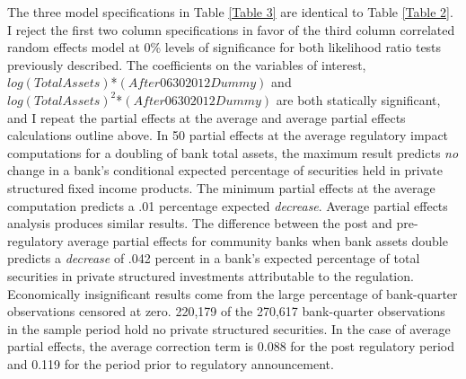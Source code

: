 \documentclass[preprint,12pt]{elsarticle}
\begin{document}
The three model specifications in Table \ref{Table 3} are identical to Table \ref{Table 2}.  I reject the first two column specifications in favor of the third column correlated random effects model at 0\% levels of significance for both likelihood ratio tests previously described.  The coefficients on the variables of interest, $log(TotalAssets)$*$(After06302012Dummy)$ and \\ $log(TotalAssets)^{2}$*$(After06302012Dummy)$ are both statically significant, and I repeat the partial effects at the average and average partial effects calculations outline above.  In 50 partial effects at the average regulatory impact computations for a doubling of bank total assets, the maximum result predicts \textit{no} change in a bank's conditional expected percentage of securities held in private structured fixed income products.  The minimum partial effects at the average computation predicts a .01 percentage expected \textit{decrease}.  Average partial effects analysis produces similar results.  The difference between the post and pre-regulatory average partial effects for community banks when bank assets double predicts a \textit{decrease} of .042 percent in a bank's expected percentage of total securities in private structured investments attributable to the regulation.  Economically insignificant results come from the large percentage of bank-quarter observations censored at zero.  220,179 of the 270,617 bank-quarter observations in the sample period hold no private structured securities. In the case of average partial effects, the average correction term is 0.088 for the post regulatory period and 0.119 for the period prior to regulatory announcement. 
\end{document}
